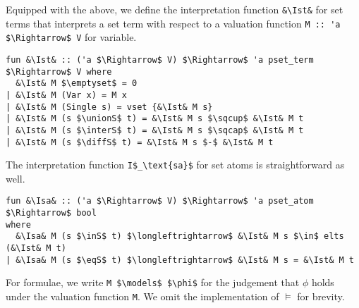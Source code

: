 \documentclass[sigplan,10pt,anonymous,review]{acmart}
\newcommand{\unionS}{\sqcup_\text{s}}
\newcommand{\interS}{\sqcap_\text{s}}
\newcommand{\diffS}{-_\text{s}}
\newcommand{\inS}{\in_\text{s}}
\newcommand{\eqS}{=_\text{s}}
\newcommand{\Ist}{I$_\text{st}$}
\newcommand{\Isa}{I$_\text{sa}$}
\begin{document}
Equipped with the above, we define the interpretation function \lstinline!&\Ist&! for set terms that interprets a set term with respect to a valuation function \lstinline!M :: 'a $\Rightarrow$ V! for variable.
\begin{lstlisting}
fun &\Ist& :: ('a $\Rightarrow$ V) $\Rightarrow$ 'a pset_term $\Rightarrow$ V where
  &\Ist& M $\emptyset$ = 0
| &\Ist& M (Var x) = M x
| &\Ist& M (Single s) = vset {&\Ist& M s}
| &\Ist& M (s $\unionS$ t) = &\Ist& M s $\sqcup$ &\Ist& M t 
| &\Ist& M (s $\interS$ t) = &\Ist& M s $\sqcap$ &\Ist& M t 
| &\Ist& M (s $\diffS$ t) = &\Ist& M s $-$ &\Ist& M t 
\end{lstlisting}
The interpretation function \lstinline!I$_\text{sa}$! for set atoms is straightforward as well.
\begin{lstlisting}
fun &\Isa& :: ('a $\Rightarrow$ V) $\Rightarrow$ 'a pset_atom $\Rightarrow$ bool
where
  &\Isa& M (s $\inS$ t) $\longleftrightarrow$ &\Ist& M s $\in$ elts (&\Ist& M t)
| &\Isa& M (s $\eqS$ t) $\longleftrightarrow$ &\Ist& M s = &\Ist& M t
\end{lstlisting}
For formulae, we write \lstinline!M $\models$ $\phi$! for the judgement that $\phi$ holds under the valuation function \lstinline!M!.
We omit the implementation of $\models$ for brevity.
\end{document}
